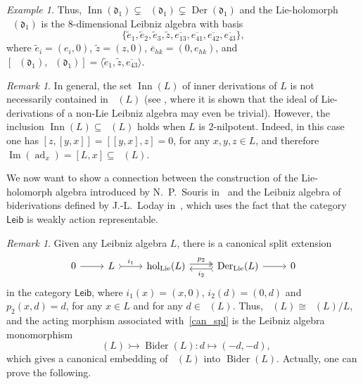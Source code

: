 \documentclass[11pt,a4paper]{amsart}
\theoremstyle{plain}
\theoremstyle{definition}
\theoremstyle{remark}
\newtheorem{remark}[subsection]{Remark}
\newtheorem{example}[subsection]{Example}
\numberwithin{equation}{section}
\newcommand{\0}{\emptyset}
\DeclareMathOperator{\Imm}{Im}
\DeclareMathOperator{\Der}{Der}
\DeclareMathOperator{\DerL}{Der_{Lie}}
\DeclareMathOperator{\Bider}{Bider}
\DeclareMathOperator{\Inn}{Inn}
\DeclareMathOperator{\ad}{ad}
\DeclareMathOperator{\ZL}{Z_{Lie}}
\DeclareMathOperator{\holL}{hol_{Lie}}
\newcommand{\sLeib}{\ensuremath{\mathsf{Leib}}}
\newcommand{\ov}[1]{\overline{#1}}
\begin{document}
\begin{example}
Thus, $\Inn(\mathfrak{d}_1) \subsetneq \DerL(\mathfrak{d}_1) \subsetneq \Der(\mathfrak{d}_1)$ and the Lie-holomorph $\holL(\mathfrak{d}_1)$ is the $8$-dimensional Leibniz algebra with basis
\[
\lbrace \widetilde{e}_1,\widetilde{e}_2,\widetilde{e}_3,\widetilde{z}, \ov{e_{13}},\ov{e_{41}},\ov{e_{42}},\ov{e_{43}}\rbrace,
\]
where $\widetilde{e}_i=(e_i,0)$, $\widetilde{z}=(z,0)$, $\ov{e}_{hk}=(0,e_{hk})$, and $[\holL(\mathfrak{d}_1),\holL(\mathfrak{d}_1)]=\langle \widetilde{e}_1,\widetilde{z},\ov{e_{43}} \rangle$.
\end{example}

\begin{remark}
In general, the set $\Inn(L)$ of inner derivations of $L$ is not necessarily contained in $\DerL(L)$ (see , where it is shown that the ideal of Lie-derivations of a non-Lie Leibniz algebra may even be trivial). However, the inclusion $\Inn(L) \subseteq \DerL(L)$ holds when $L$ is $2$-nilpotent. Indeed, in this case one has $[z,[y,x]]=[[y,x],z]=0$, for any $x,y,z \in L$, and therefore $\Imm(\ad_x)=[L,x] \subseteq \ZL(L)$.
\end{remark}

We now want to show a connection between the construction of the Lie-holomorph algebra introduced by N.~P.~Souris in~\cite{souris} and the Leibniz algebra of biderivations defined by J.-L.~Loday in~\cite{loday1993}, which uses the fact that the category $\sLeib$ is weakly action representable.

\begin{remark}
Given any Leibniz algebra $L$, there is a canonical split extension
\begin{equation}\label{can_spl}
\begin{tikzcd}
{0} & {L} & {\holL(L)} & {\DerL(L)} & {0}
\arrow[from=1-1, to=1-2]
\arrow["{i_1}", tail, from=1-2, to=1-3]
\arrow["{p_2}", twoheadrightarrow, shift left, from=1-3, to=1-4]
\arrow["{i_2}", tail, shift left, from=1-4, to=1-3]
\arrow[from=1-4, to=1-5]
\end{tikzcd}    
\end{equation}
in the category $\sLeib$, where $i_1(x)=(x,0)$, $i_2(d)=(0,d)$ and $p_2(x,d)=d$, for any $x \in L$ and for any $d \in \DerL(L)$. Thus, $\DerL(L) \cong \holL(L)/L$, and the acting morphism associated with~\eqref{can_spl} is the Leibniz algebra monomorphism
\[
\DerL(L) \rightarrowtail \Bider(L) \colon d \mapsto (-d,-d),
\]
which gives a canonical embedding of $\DerL(L)$ into $\Bider(L)$. Actually, one can prove the following.
\end{remark}
\end{document}
